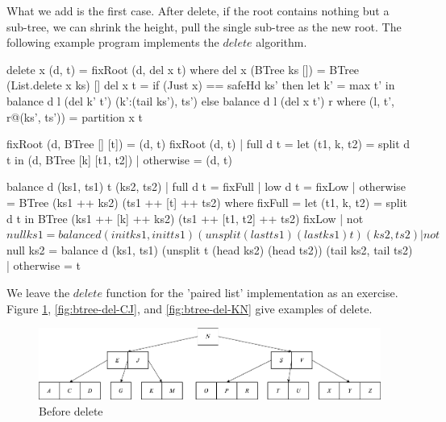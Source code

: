 \documentclass[b5paper]{article}
\begin{document}
What we add is the first case. After delete, if the root contains nothing but a sub-tree, we can shrink the height, pull the single sub-tree as the new root. The following example program implements the $delete$ algorithm.

\begin{Haskell}
delete x (d, t) = fixRoot (d, del x t) where
    del x (BTree ks []) = BTree (List.delete x ks) []
    del x t = if (Just x) == safeHd ks' then
                let k' = max t' in
                   balance d l (del k' t') (k':(tail ks'), ts')
              else balance d l (del x t') r
      where
        (l, t', r@(ks', ts')) = partition x t

fixRoot (d, BTree [] [t]) = (d, t)
fixRoot (d, t) | full d t  = let (t1, k, t2) = split d t in
                               (d, BTree [k] [t1, t2])
               | otherwise = (d, t)

balance d (ks1, ts1) t (ks2, ts2)
    | full d t  = fixFull
    | low  d t  = fixLow
    | otherwise = BTree (ks1 ++ ks2) (ts1 ++ [t] ++ ts2)
  where
    fixFull = let (t1, k, t2) = split d t in
                BTree (ks1 ++ [k] ++ ks2) (ts1 ++ [t1, t2] ++ ts2)
    fixLow | not $ null ks1 = balance d (init ks1, init ts1)
                                      (unsplit (last ts1) (last ks1) t)
                                      (ks2, ts2)
           | not $ null ks2 = balance d (ks1, ts1)
                                      (unsplit t (head ks2) (head ts2))
                                      (tail ks2, tail ts2)
           | otherwise = t
\end{Haskell}

We leave the $delete$ function for the 'paired list' implementation as an exercise. Figure \ref{fig:btree-del-before}, \ref{fig:btree-del-CJ}, and \ref{fig:btree-del-KN} give examples of delete.

\begin{figure}[htbp]
  \centering
  \includegraphics[scale=0.33]{img/btree-del-before.png}
  \caption{Before delete}
  \label{fig:btree-del-before}
\end{figure}
\end{document}
